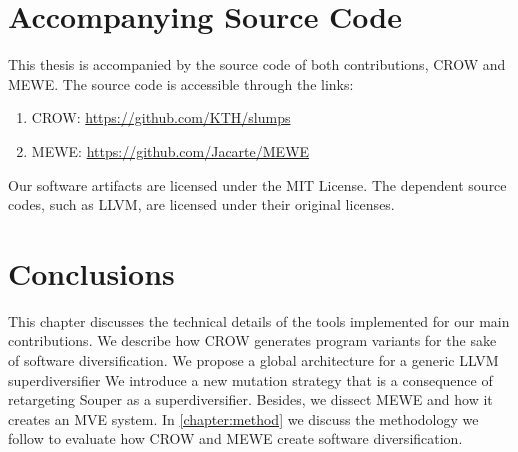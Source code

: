 \section{Accompanying Source Code}

This thesis is accompanied by the source code of both contributions, CROW and MEWE. The source code is accessible through the links:
\begin{enumerate}
    \item CROW: \url{https://github.com/KTH/slumps}
    \item MEWE: \url{https://github.com/Jacarte/MEWE}
\end{enumerate}

Our software artifacts are licensed under the MIT License. The dependent source codes, such as LLVM, are licensed under their original licenses.

\section*{Conclusions}

This chapter discusses the technical details of the tools implemented for our main contributions.
We describe how CROW generates program variants for the sake of software diversification.
We propose a global architecture for a generic LLVM superdiversifier
We introduce a new mutation strategy that is a consequence of retargeting Souper as a superdiversifier.
Besides, we dissect MEWE and how it creates an MVE system.
In \autoref{chapter:method} we discuss the methodology we follow to evaluate how CROW and MEWE create software diversification.